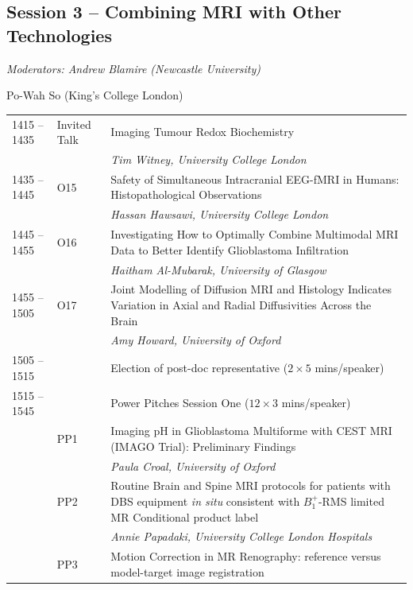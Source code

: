\documentclass[a5paper,10pt,twoside,onecolumn,openany,helvetica,showtrims]{memoir}
\newlength{\JackBoxOne}
\newlength{\JackBoxTwo}
\newlength{\JackBoxThree}
\newlength{\LittleSkip}
\newcommand{\talkauthor}[1]{\small\emph{#1}}
\begin{document}
\subsection*{Session 3 -- Combining MRI with Other Technologies}
\begin{flushright}
\itshape Moderators: Andrew Blamire (Newcastle University)

Po-Wah So (King's College London)
\end{flushright}
\vspace{-2em}\noindent\hspace{-0.75em}\begin{longtable}{p{\JackBoxOne}p{\JackBoxTwo}p{\JackBoxThree}}
1415 -- 1435 & Invited Talk & Imaging Tumour Redox Biochemistry \\ 
	&	&	\talkauthor{Tim Witney, University College London}	\\
1435 -- 1445 & O15 & Safety of Simultaneous Intracranial EEG-fMRI in Humans:
Histopathological Observations \\ 
	&	& \talkauthor{Hassan Hawsawi, University College London} \\
1445 -- 1455 & O16 & Investigating How to Optimally Combine Multimodal MRI Data to Better
Identify Glioblastoma Infiltration \\ 
	&	& \talkauthor{Haitham Al-Mubarak, University of Glasgow} \\
1455 -- 1505 & O17 & Joint Modelling of Diffusion MRI and Histology Indicates Variation in Axial
and Radial Diffusivities Across the Brain \\
	&	& \talkauthor{Amy Howard, University of Oxford}\\[3\LittleSkip]
1505 -- 1515 & & Election of post-doc representative ($2\times 5$ mins/speaker) \\[3\LittleSkip]
1515 -- 1545 &  & Power Pitches Session One ($12\times3$ mins/speaker) \\[2\LittleSkip]
& PP1 & Imaging pH in Glioblastoma Multiforme with CEST MRI (IMAGO Trial): Preliminary Findings  \\
&&\talkauthor{Paula Croal, University of Oxford} \\ 
& PP2 & Routine Brain and Spine MRI protocols for patients with DBS equipment \emph{in situ} consistent with $B_{1}^{+}$-RMS limited MR Conditional product label \\ 
& & \talkauthor{Annie Papadaki, University College London Hospitals} \\
& PP3 & Motion Correction in MR Renography: reference versus model-target image registration \\ 

\end{longtable}
\end{document}
